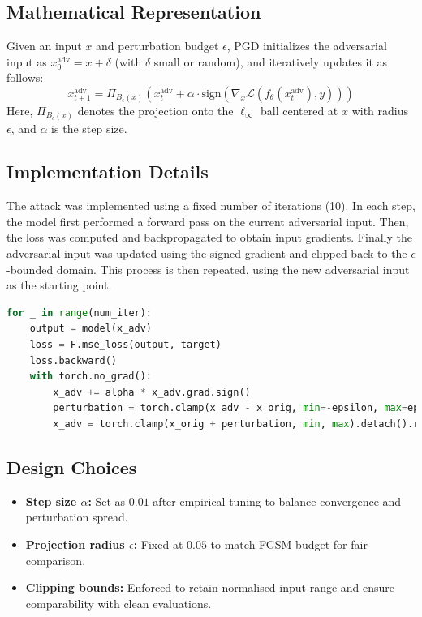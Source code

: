 \subsection*{Mathematical Representation}
Given an input $x$ and perturbation budget $\epsilon$, PGD initializes the adversarial input as $x_0^{\text{adv}} = x + \delta$ (with $\delta$ small or random), and iteratively updates it as follows:
\[
x_{t+1}^{\text{adv}} = \Pi_{B_\epsilon(x)} \left( x_t^{\text{adv}} + \alpha \cdot \text{sign}\left( \nabla_x \mathcal{L}(f_\theta(x_t^{\text{adv}}), y) \right) \right)
\]
Here, $\Pi_{B_\epsilon(x)}$ denotes the projection onto the $\ell_\infty$ ball centered at $x$ with radius $\epsilon$, and $\alpha$ is the step size.

\subsection*{Implementation Details}
The attack was implemented using a fixed number of iterations (10). In each step, the model first performed a forward pass on the current adversarial input. Then, 
the loss was computed and backpropagated to obtain input gradients. Finally the adversarial input was updated using the signed gradient and clipped back to the $\epsilon$-bounded domain. This process is then repeated, using the new adversarial input as the starting point.

\begin{lstlisting}[language=Python, caption={PGD Attack Loop (Simplified)}]
for _ in range(num_iter):
    output = model(x_adv)
    loss = F.mse_loss(output, target)
    loss.backward()
    with torch.no_grad():
        x_adv += alpha * x_adv.grad.sign()
        perturbation = torch.clamp(x_adv - x_orig, min=-epsilon, max=epsilon)
        x_adv = torch.clamp(x_orig + perturbation, min, max).detach().requires_grad_()
\end{lstlisting}

\subsection*{Design Choices}
\begin{itemize}
    \item \textbf{Step size $\alpha$:} Set as $0.01$ after empirical tuning to balance convergence and perturbation spread.
    \item \textbf{Projection radius $\epsilon$:} Fixed at $0.05$ to match FGSM budget for fair comparison.
    \item \textbf{Clipping bounds:} Enforced to retain normalised input range and ensure comparability with clean evaluations.
\end{itemize}

